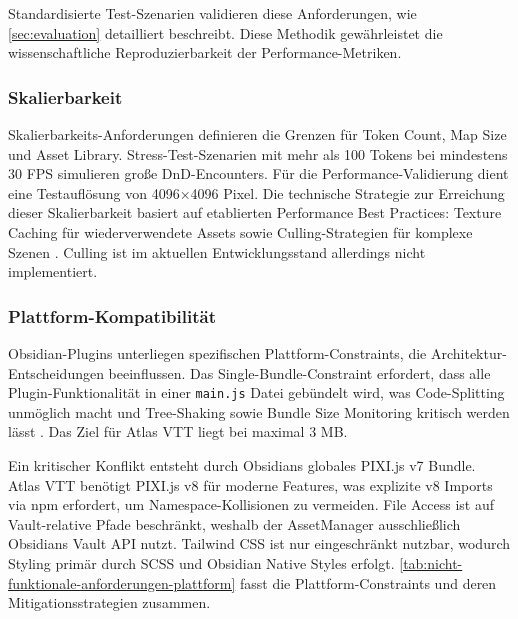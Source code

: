 Standardisierte Test-Szenarien validieren diese Anforderungen, wie \autoref{sec:evaluation} detailliert beschreibt. Diese Methodik gewährleistet die wissenschaftliche Reproduzierbarkeit der Performance-Metriken.

\subsubsection{Skalierbarkeit}

Skalierbarkeits-Anforderungen definieren die Grenzen für Token Count, Map Size und Asset Library. Stress-Test-Szenarien mit mehr als 100 Tokens bei mindestens 30 \ac{FPS} simulieren große \ac{DnD}-Encounters. Für die Performance-Validierung dient eine Testauflösung von 4096×4096 Pixel.
Die technische Strategie zur Erreichung dieser Skalierbarkeit basiert auf etablierten Performance Best Practices: Texture Caching für wiederverwendete Assets sowie Culling-Strategien für komplexe Szenen \autocite{PixiPerf2024}. Culling ist im aktuellen Entwicklungsstand allerdings nicht implementiert.

\subsubsection{Plattform-Kompatibilität}

Obsidian-Plugins unterliegen spezifischen Plattform-Constraints, die Architektur-Entscheidungen beeinflussen. Das Single-Bundle-Constraint erfordert, dass alle Plugin-Funktionalität in einer \texttt{main.js} Datei gebündelt wird, was Code-Splitting unmöglich macht und Tree-Shaking sowie Bundle Size Monitoring kritisch werden lässt \autocite{ObsidianPluginDev2024}. Das Ziel für Atlas \ac{VTT} liegt bei maximal 3 \ac{MB}.

Ein kritischer Konflikt entsteht durch Obsidians globales PIXI.js v7 Bundle. Atlas \ac{VTT} benötigt PIXI.js v8 für moderne Features, was explizite v8 Imports via npm erfordert, um Namespace-Kollisionen zu vermeiden. File Access ist auf Vault-relative Pfade beschränkt, weshalb der AssetManager ausschließlich Obsidians Vault \ac{API} nutzt. Tailwind \ac{CSS} ist nur eingeschränkt nutzbar, wodurch Styling primär durch \ac{SCSS} und Obsidian Native Styles erfolgt. \autoref{tab:nicht-funktionale-anforderungen-plattform} fasst die Plattform-Constraints und deren Mitigationsstrategien zusammen.

